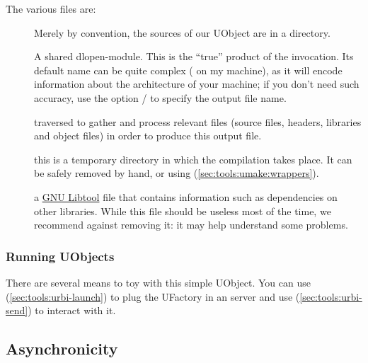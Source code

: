 The various files are:
\begin{description}
\item[] Merely by convention, the sources of our
  UObject are in a  directory.
\item[] A shared dlopen-module.  This is the ``true''
  product of the  invocation.  Its default name
  can be quite complex ( on my
  machine), as it will encode information about the architecture of
  your machine; if you don't need such accuracy, use the option
  / to specify the output file name.

   traversed  to gather and
  process relevant files (source files, headers, libraries and object
  files) in order to produce this output file.

\item[] this is a temporary directory in
  which the compilation takes place.  It can be safely removed by
  hand, or using 
  (\autoref{sec:tools:umake:wrappers}).

\item[] a
  \href{http://www.gnu.org/software/libtool/}{GNU Libtool} file that
  contains information such as dependencies on other libraries.  While
  this file should be useless most of the time, we recommend against
  removing it: it may help understand some problems.
\end{description}

\subsubsection{Running UObjects}

There are several means to toy with this simple UObject.  You can use
 (\autoref{sec:tools:urbi-launch}) to plug the
UFactory in an \urbi server and use 
(\autoref{sec:tools:urbi-send}) to interact with it.



\subsection{Asynchronicity}


